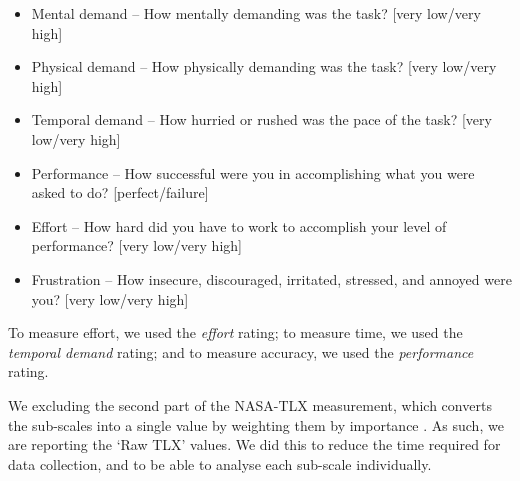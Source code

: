 
{\singlespacing
\begin{itemize}
  \item Mental demand -- How mentally demanding was the task? [very low/very high]
  \item Physical demand -- How physically demanding was the task? [very low/very high]
  \item Temporal demand -- How hurried or rushed was the pace of the task?  [very low/very high]
  \item Performance -- How successful were you in accomplishing what you were asked to do? [perfect/failure]
  \item Effort -- How hard did you have to work to accomplish your level of performance? [very low/very high]
  \item Frustration -- How insecure, discouraged, irritated, stressed, and annoyed were you? [very low/very high]
\end{itemize}
}

To measure effort, we used the \textit{effort} rating; to measure time, we used the \textit{temporal demand} rating;
and to measure accuracy, we used the \textit{performance} rating.

We excluding the second part of the NASA-TLX measurement, which converts the sub-scales into a single value by weighting
them by importance \citep{Hart2006}. As such, we are reporting the `Raw TLX' values.  We did this to reduce the time
required for data collection, and to be able to analyse each sub-scale individually.

